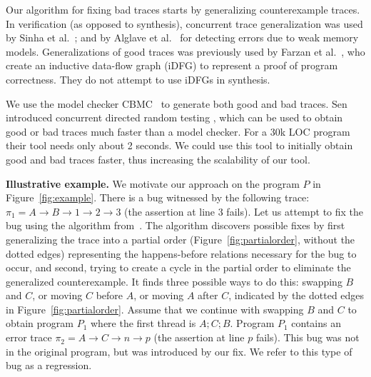 \documentclass{llncs}
\newcommand\trace{\pi}
\begin{document}
Our algorithm for fixing bad traces starts by generalizing
counterexample traces.  
In verification (as opposed to synthesis), 
concurrent trace generalization was used by
Sinha et
al.\ \cite{Sinha:2011:IA:1926385.1926433,DBLP:conf/sigsoft/SinhaW10};
and by Alglave et
al.\ \cite{DBLP:conf/cav/AlglaveKT13} for detecting errors due to weak
memory models.
Generalizations of good traces was previously used by Farzan et
al.\ \cite{Farzan:2013:IDF:2480359.2429086}, who create an inductive
data-flow graph (iDFG) to represent a proof of program correctness. 
They do not attempt to use iDFGs in synthesis. 

We use the model checker CBMC~\cite{cbmc} to generate both good and bad
traces.
Sen introduced concurrent directed random testing
\cite{Sen:2008:RDR:1375581.1375584}, which can be used to obtain good
or bad traces much faster than a model checker.
For a 30k LOC program their tool needs only about 2
seconds. 
We could use this tool to initially obtain good and bad traces
faster, thus increasing the scalability of our tool. 





\noindent
{\bf Illustrative example.}
We motivate our approach on the program $P$ in
Figure~\ref{fig:example}.    
There is a bug witnessed by the following trace:
$\trace_1 = A \to B \to 1 \to 2 \to 3$ (the assertion at line $3$ fails). 
Let us attempt to fix the bug using the algorithm from~\cite{cav2013}.
The algorithm discovers possible fixes by first generalizing the trace
into a partial order (Figure~\ref{fig:partialorder}, without the dotted 
edges) representing the happens-before relations necessary for the bug
to occur, and second, trying to create a cycle in the partial order to
eliminate the generalized counterexample.
It finds three possible ways to do this: swapping $B$ and
$C$, or moving $C$ before $A$, or moving $A$ after $C$, indicated by
the dotted edges in Figure~\ref{fig:partialorder}. 
Assume that we continue with swapping $B$ and $C$ to obtain program
$P_1$ where the first thread is $A; C; B$. 
Program $P_1$ contains an error trace $\trace_2 = A \to C \to
n \to p$ (the assertion at line $p$ fails). 
This bug was not in the original program, but was introduced
by our fix. 
We refer to this type of bug as a regression. 
\end{document}
